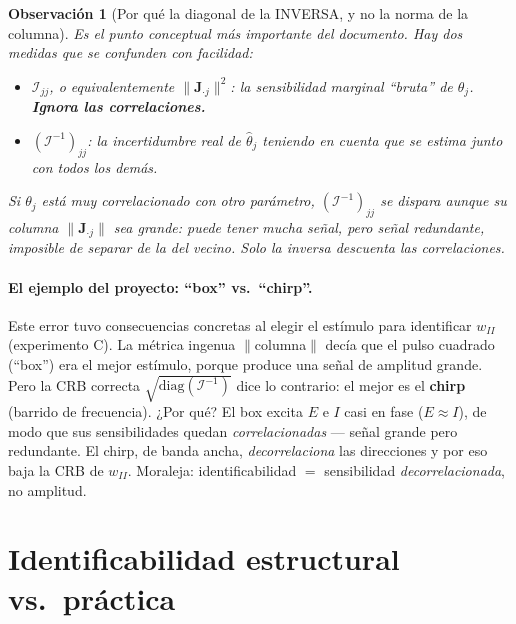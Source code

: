 \documentclass[11pt,a4paper]{article}
\newtheorem{remark}{Observación}
\newcommand{\FIM}{\mathcal{I}}
\newcommand{\J}{\mathbf{J}}
\begin{document}
\begin{remark}[Por qué la diagonal de la INVERSA, y no la norma de la columna]
Es el punto conceptual más importante del documento. Hay dos medidas que se confunden con facilidad:
\begin{itemize}[nosep]
  \item $\FIM_{jj}$, o equivalentemente $\lVert\J_{\cdot j}\rVert^2$: la sensibilidad \emph{marginal} ``bruta'' de $\theta_j$. \textbf{Ignora las correlaciones.}
  \item $(\FIM^{-1})_{jj}$: la incertidumbre \emph{real} de $\hat\theta_j$ teniendo en cuenta que se estima \emph{junto con todos los demás}.
\end{itemize}
Si $\theta_j$ está muy correlacionado con otro parámetro, $(\FIM^{-1})_{jj}$ se dispara aunque su columna $\lVert\J_{\cdot j}\rVert$ sea grande: puede tener mucha señal, pero señal \emph{redundante}, imposible de separar de la del vecino. Solo la inversa descuenta las correlaciones.
\end{remark}

\paragraph{El ejemplo del proyecto: ``box'' vs.\ ``chirp''.} Este error tuvo consecuencias concretas al elegir el estímulo para identificar $w_{II}$ (experimento C). La métrica ingenua $\lVert$columna$\rVert$ decía que el pulso cuadrado (``box'') era el mejor estímulo, porque produce una señal de amplitud grande. Pero la CRB correcta $\sqrt{\mathrm{diag}(\FIM^{-1})}$ dice lo contrario: el mejor es el \textbf{chirp} (barrido de frecuencia). ¿Por qué? El box excita $E$ e $I$ casi en fase ($E\approx I$), de modo que sus sensibilidades quedan \emph{correlacionadas} --- señal grande pero redundante. El chirp, de banda ancha, \emph{decorrelaciona} las direcciones y por eso baja la CRB de $w_{II}$. Moraleja: identificabilidad $=$ sensibilidad \emph{decorrelacionada}, no amplitud.

\section{Identificabilidad estructural vs.\ práctica}
\label{sec:identif}
\end{document}
